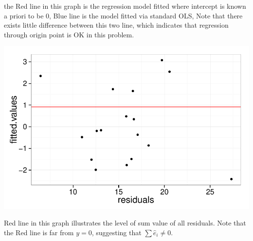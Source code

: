 \documentclass[12pt,oneside,a4paper]{article}\usepackage[]{graphicx}\usepackage[]{xcolor}
\newenvironment{knitrout}{}{} %
\begin{document}
\noindent the Red line in this graph is the regression model fitted where intercept is known a priori to be 0, Blue line is the model fitted via standard OLS, Note that there exists little difference between this two line, which indicates that regression through origin point is OK in this problem.

\begin{knitrout}
\color{fgcolor}

{\centering \includegraphics[width=.6\linewidth]{figure/p2173} 

}



\end{knitrout}

\noindent Red line in this graph illustrates the level of sum value of all residuals. Note that the Red line is far from $y = 0$, suggesting that $\sum{\hat{e}_{i}} \neq 0$.
\end{document}
